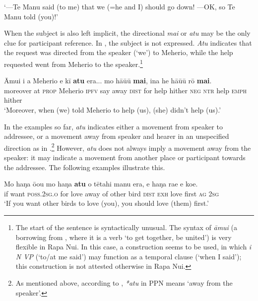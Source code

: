 \glt
‘—Te Manu said (to me) that we (=he and I) should go down! —OK, so Te Manu told (you)!’ \textstyleExampleref{[R245.221]} 
\z

When the subject is also left implicit, the directional \textit{mai} or \textit{atu} may be the only clue for participant reference. In , the subject is not expressed. \textit{Atu} indicates that the request was directed from the speaker (‘we’) to Meherio, while the help requested went from Meherio to the speaker.\footnote{\label{fn:352}The start of the sentence is syntactically unusual. The syntax of \textit{{\ꞌ}āmui} (a borrowing from , where it is a verb ‘to get together, be united’) is very flexible in Rapa Nui. In this case, a  construction seems to be used, in which \textit{i N VP} (‘to/at me said’) may function as a temporal clause (‘when I said’); this construction is not attested otherwise in Rapa Nui.}

\ea\label{ex:7.131}
\gll {\ꞌ}Āmui i a Meherio e kī \textbf{atu} era... mo hā{\ꞌ}ū{\ꞌ}ū \textbf{mai},  {\ꞌ}ina he hā{\ꞌ}ū{\ꞌ}ū rō \textbf{mai}.\\
moreover at \textsc{prop} Meherio \textsc{ipfv} say away \textsc{dist} for help hither  \textsc{neg} \textsc{ntr} help \textsc{emph} hither\\

\glt 
‘Moreover, when (we) told Meherio to help (us), (she) didn’t help (us).’ \textstyleExampleref{[R315.031]} 
\z

In the examples so far, \textit{atu} indicates either a movement from speaker to addressee, or a movement away from speaker and hearer in an unspecified direction as in .\footnote{\label{fn:353}As mentioned above, according to \citet[34]{Clark1976}, \textit{*atu} in PPN means ‘away from the speaker’.} However, \textit{atu} does not always imply a movement away from the speaker: it may indicate a movement from another place or participant towards the addressee. The following examples illustrate this.

\ea\label{ex:7.132}
\gll Mo haŋa ō{\ꞌ}ou mo haŋa \textbf{atu} o tētahi manu era, e haŋa ra{\ꞌ}e e koe. \\
if want \textsc{poss.2sg.o} for love away of other bird \textsc{dist} \textsc{exh} love first \textsc{ag} \textsc{2sg} \\

\glt 
‘If you want other birds to love (you), you should love (them) first.’ \textstyleExampleref{[R213.050]} 
\z

